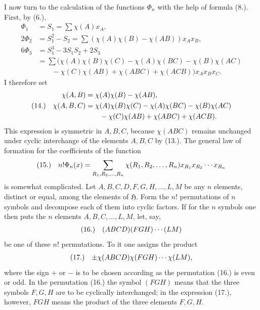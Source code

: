 \documentclass[11pt]{article}
\makeatletter
\newcommand{\Hgrp}{\mathfrak{H}}
\newcommand{\frobtag}[2]{\[\begin{array}{@{}r@{\quad}l@{}}\textup{(#1)} & \displaystyle #2\end{array}\]}
\newcommand{\frobtagc}[2]{\[\begin{array}{@{}r@{\quad}c@{}}\textup{(#1)} & \displaystyle #2\end{array}\]}
\makeatother
\begin{document}
I now turn to the calculation of the functions $\Phi_n$ with the help of formula (8.). First, by (6.),
\[
\begin{aligned}
\Phi_1&=S_1=\sum\chi(A)x_A,\\
2\Phi_2&=S_1^2-S_2=\sum(\chi(A)\chi(B)-\chi(AB))x_Ax_B,\\
6\Phi_3&=S_1^3-3S_1S_2+2S_3\\
&=\sum\bigl(\chi(A)\chi(B)\chi(C)-\chi(A)\chi(BC)-\chi(B)\chi(AC)\\
&\qquad-\chi(C)\chi(AB)+\chi(ABC)+\chi(ACB)\bigr)x_Ax_Bx_C.
\end{aligned}
\]
I therefore set
\frobtag{14.}{\begin{aligned}
\chi(A,B)&=\chi(A)\chi(B)-\chi(AB),\\
\chi(A,B,C)&=\chi(A)\chi(B)\chi(C)-\chi(A)\chi(BC)-\chi(B)\chi(AC)\\
&\qquad-\chi(C)\chi(AB)+\chi(ABC)+\chi(ACB).
\end{aligned}}
This expression is symmetric in $A,B,C$, because $\chi(ABC)$ remains unchanged under cyclic interchange of the elements $A,B,C$ by (13.). The general law of formation for the coefficients of the function
\frobtagc{15.}{n!\Phi_n(x)=\sum_{R_1,R_2,\ldots,R_n}\chi(R_1,R_2,\ldots,R_n)x_{R_1}x_{R_2}\cdots x_{R_n}}
is somewhat complicated. Let $A,B,C,D,F,G,H,\ldots,L,M$ be any $n$ elements, distinct or equal, among the elements of $\Hgrp$. Form the $n!$ permutations of $n$ symbols and decompose each of them into cyclic factors. If for the $n$ symbols one then puts the $n$ elements $A,B,C,\ldots,L,M$, let, say,
\frobtagc{16.}{(ABCD)(FGH)\cdots(LM)}
be one of these $n!$ permutations. To it one assigns the product
\frobtagc{17.}{\pm\chi(ABCD)\chi(FGH)\cdots\chi(LM),}
where the sign $+$ or $-$ is to be chosen according as the permutation (16.) is even or odd. In the permutation (16.) the symbol $(FGH)$ means that the three symbols $F,G,H$ are to be cyclically interchanged; in the expression (17.), however, $FGH$ means the product of the three elements $F,G,H$.
\end{document}
